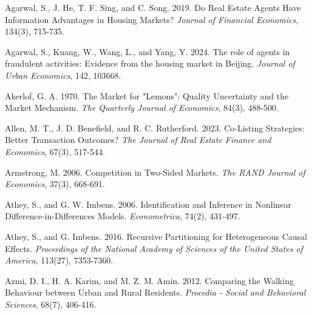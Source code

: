 \documentclass[11pt]{article}
\begin{document}
\clearpage
\begin{singlespace}
%
%
% 
% 

\begin{thebibliography}{}
Agarwal, S., J. He, T. F. Sing, and C. Song. 2019. Do Real Estate Agents Have Information Advantages in Housing Markets? \textit{Journal of Financial Economics}, 134(3), 715-735. 

Agarwal, S., Kuang, W., Wang, L., and Yang, Y. 2024. The role of agents in fraudulent activities: Evidence from the housing market in Beijing. \textit{Journal of Urban Economics}, 142, 103668. 

Akerlof, G. A. 1970. The Market for "Lemons": Quality Uncertainty and the Market Mechanism. \textit{The Quarterly Journal of Economics}, 84(3), 488-500. 

Allen, M. T., J. D. Benefield, and R. C. Rutherford. 2023. Co-Listing Strategies: Better Transaction Outcomes? \textit{The Journal of Real Estate Finance and Economics}, 67(3), 517-544. 

Armstrong, M. 2006. Competition in Two-Sided Markets. \textit{The RAND Journal of Economics}, 37(3), 668-691. 

Athey, S., and G. W. Imbens. 2006. Identification and Inference in Nonlinear Difference-in-Differences Models. \textit{Econometrica}, 74(2), 431-497.%

Athey, S., and G. Imbens. 2016. Recursive Partitioning for Heterogeneous Causal Effects. \textit{Proceedings of the National Academy of Sciences of the United States of America}, 113(27), 7353-7360. 

Azmi, D. I., H. A. Karim, and M. Z. M. Amin. 2012. Comparing the Walking Behaviour between Urban and Rural Residents. \textit{Procedia - Social and Behavioral Sciences}, 68(7), 406-416. %


\end{thebibliography}
\end{singlespace}
\end{document}
